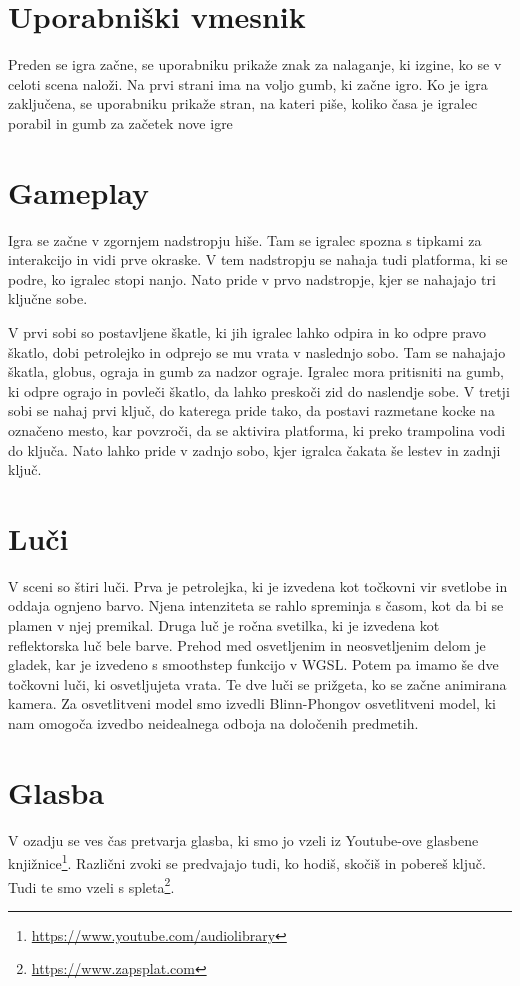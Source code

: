 \documentclass[a4paper,12pt]{article}
\begin{document}
\section{Uporabniški vmesnik}
\noindent Preden se igra začne, se uporabniku prikaže znak za nalaganje, ki izgine, ko se v celoti scena naloži. Na prvi strani ima na voljo gumb, ki začne igro. Ko je igra zaključena, se uporabniku prikaže stran, na kateri piše, koliko časa je igralec porabil in gumb za začetek nove igre



\section{Gameplay}
Igra se začne v zgornjem nadstropju hiše. Tam se igralec spozna s tipkami za interakcijo in vidi prve okraske. V tem nadstropju se nahaja tudi platforma, ki se podre, ko igralec stopi nanjo. Nato pride v prvo nadstropje, kjer se nahajajo tri ključne sobe.

 V prvi sobi so postavljene škatle, ki jih igralec lahko odpira in ko odpre pravo škatlo, dobi petrolejko in odprejo se mu vrata v naslednjo sobo. Tam se nahajajo škatla, globus, ograja in gumb za nadzor ograje. Igralec mora pritisniti na gumb, ki odpre ograjo in povleči škatlo, da lahko preskoči zid do naslendje sobe. V tretji sobi se nahaj prvi ključ, do katerega pride tako, da postavi razmetane kocke na označeno mesto, kar povzroči, da se aktivira platforma, ki preko trampolina vodi do ključa. Nato lahko pride v zadnjo sobo, kjer igralca čakata še lestev in zadnji ključ.
 

\section{Luči}
V sceni so štiri luči. Prva je petrolejka, ki je izvedena kot točkovni vir svetlobe in oddaja ognjeno barvo. Njena intenziteta se rahlo spreminja s časom, kot da bi se plamen v njej premikal. Druga luč je ročna svetilka, ki je izvedena kot reflektorska luč bele barve. Prehod med osvetljenim in neosvetljenim delom je gladek, kar je izvedeno s smoothstep funkcijo v WGSL. Potem pa imamo še dve točkovni luči, ki osvetljujeta vrata. Te dve luči se prižgeta, ko se začne animirana kamera.
Za osvetlitveni model smo izvedli Blinn-Phongov osvetlitveni model, ki nam omogoča izvedbo neidealnega odboja na določenih predmetih.

\section{Glasba}
V ozadju se ves čas pretvarja glasba, ki smo jo vzeli iz Youtube-ove glasbene knjižnice\footnote{\url{https://www.youtube.com/audiolibrary}}. Različni zvoki se predvajajo tudi, ko hodiš, skočiš in pobereš ključ. Tudi te smo vzeli s spleta\footnote{\url{https://www.zapsplat.com}}.
\end{document}
